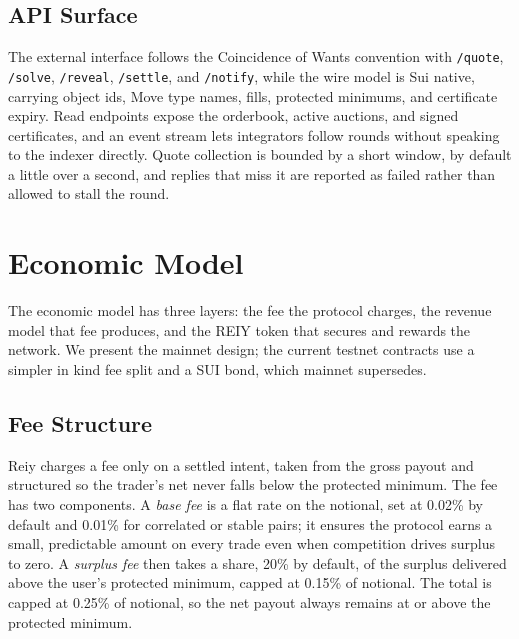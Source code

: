 \documentclass[10pt,sigconf,nonacm]{acmart}
\theoremstyle{reiythm}
\begin{document}
\subsection{API Surface}

The external interface follows the Coincidence of Wants convention with
\texttt{/quote}, \texttt{/solve}, \texttt{/reveal}, \texttt{/settle}, and
\texttt{/notify}, while the wire model is Sui native, carrying object ids, Move
type names, fills, protected minimums, and certificate expiry. Read endpoints
expose the orderbook, active auctions, and signed certificates, and an event
stream lets integrators follow rounds without speaking to the indexer directly.
Quote collection is bounded by a short window, by default a little over a second,
and replies that miss it are reported as failed rather than allowed to stall the
round.

\section{Economic Model}

The economic model has three layers: the fee the protocol charges, the revenue
model that fee produces, and the REIY token that secures and rewards the network.
We present the mainnet design; the current testnet contracts use a simpler in kind
fee split and a SUI bond, which mainnet supersedes.

\subsection{Fee Structure}

Reiy charges a fee only on a settled intent, taken from the gross payout and
structured so the trader's net never falls below the protected minimum. The fee
has two components. A \emph{base fee} is a flat rate on the notional, set at
0.02\% by default and 0.01\% for correlated or stable pairs; it ensures the
protocol earns a small, predictable amount on every trade even when competition
drives surplus to zero. A \emph{surplus fee} then takes a share, 20\% by default,
of the surplus delivered above the user's protected minimum, capped at 0.15\% of
notional. The total is capped at 0.25\% of notional, so the net payout always
remains at or above the protected minimum.
\end{document}
